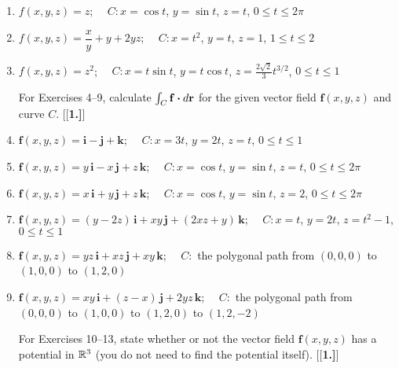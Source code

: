 \begin{enumerate}[\bfseries 1.]
 \item $f(x,y,z)=z$; $\quad C: x=\cos t$, $y=\sin t$, $z=t$, $0 \le t \le 2\pi$
 \item $f(x,y,z)=\dfrac{x}{y} + y + 2yz$; $\quad C: x=t^2$, $y=t$, $z=1$, $1 \le t \le 2$
 \item $f(x,y,z)=z^2$; $\quad C: x=t\sin t$, $y=t\cos t$, $z=\frac{2\sqrt{2}}{3}t^{3/2}$, $0 \le t \le 1$
\par\noindent For Exercises 4--9, calculate $\int_C \mathbf{f} \bm{\cdot} d\mathbf{r}$ for the given vector
 field $\mathbf{f}(x,y,z)$ and curve $C$.
[{[\bfseries 1.]}]
 \item $\mathbf{f}(x,y,z) = \mathbf{i} - \mathbf{j} + \mathbf{k}$; $\quad C: x=3t$, $y=2t$, $z=t$, $0 \le t \le 1$
 \item $\mathbf{f}(x,y,z) = y\,\mathbf{i} - x\,\mathbf{j} + z\,\mathbf{k}$; $\quad C: x=\cos t$, $y=\sin t$, $z=t$,
  $0 \le t \le 2\pi$
 \item $\mathbf{f}(x,y,z) = x\,\mathbf{i} + y\,\mathbf{j} + z\,\mathbf{k}$; $\quad C: x=\cos t$, $y=\sin t$, $z=2$,
  $0 \le t \le 2\pi$
 \item $\mathbf{f}(x,y,z) = (y-2z)\,\mathbf{i} + xy\,\mathbf{j} + (2xz+y)\,\mathbf{k}$; $\quad C: x=t$, $y=2t$,
  $z = t^2 - 1$, $0 \le t \le 1$
 \item $\mathbf{f}(x,y,z) = yz\,\mathbf{i} + xz\,\mathbf{j} + xy\,\mathbf{k}$; $\quad C:$ the polygonal path from
  $(0,0,0)$ to $(1,0,0)$ to $(1,2,0)$
 \item $\mathbf{f}(x,y,z) = xy\,\mathbf{i} + (z-x)\,\mathbf{j} + 2yz\,\mathbf{k}$; $\quad C:$ the polygonal path from
  $(0,0,0)$ to $(1,0,0)$ to $(1,2,0)$ to $(1,2,-2)$
\par\noindent For Exercises 10--13, state whether or not the vector field $\mathbf{f}(x,y,z)$ has a potential in
$\mathbb{R}^{3}$ (you do not need to find the potential itself).
[{[\bfseries 1.]}]
\end{enumerate}
